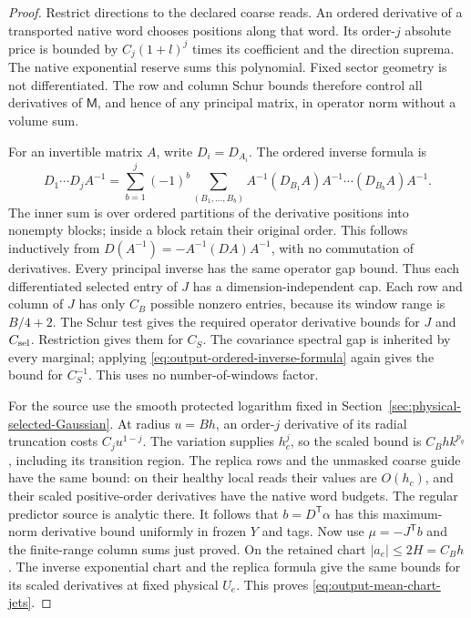 \documentclass[11pt,reqno]{amsart}
\numberwithin{equation}{section}
\theoremstyle{definition}
\theoremstyle{remark}
\begin{document}
\begin{proof}
Restrict directions to the declared coarse reads. An ordered
derivative of a transported native word chooses positions
along that word. Its order-\(j\) absolute price is bounded
by \(C_j(1+l)^j\) times its coefficient and the direction
suprema. The native exponential reserve sums this polynomial.
Fixed sector geometry is not differentiated. The row and
column Schur bounds therefore control all derivatives of
\(\mathsf M\), and hence of any principal matrix, in operator
norm without a volume sum.

For an invertible matrix \(A\), write \(D_i=D_{A_i}\).
The ordered inverse formula is
\begin{equation}
 D_1\cdots D_j A^{-1}
  =\sum_{b=1}^j(-1)^b
       \sum_{(B_1,\ldots,B_b)}
       A^{-1}(D_{B_1}A)A^{-1}\cdots(D_{B_b}A)A^{-1}.
 \label{eq:output-ordered-inverse-formula}
\end{equation}
The inner sum is over ordered partitions of the derivative
positions into nonempty blocks; inside a block retain their
original order. This follows inductively from
\(D(A^{-1})=-A^{-1}(DA)A^{-1}\), with no commutation of
derivatives. Every principal inverse has the same operator
gap bound. Thus each differentiated selected entry of \(J\)
has a dimension-independent cap. Each row and column of
\(J\) has only \(C_B\) possible nonzero entries, because its
window range is \(B/4+2\). The Schur test gives the required
operator derivative bounds for \(J\) and \(C_{\rm sel}\).
Restriction gives them for \(C_S\). The covariance spectral
gap is inherited by every marginal; applying
\eqref{eq:output-ordered-inverse-formula} again gives the
bound for \(C_S^{-1}\). This uses no number-of-windows factor.

For the source use the smooth protected logarithm fixed in
Section~\ref{sec:physical-selected-Gaussian}. At radius
\(u=Bh\), an order-\(j\) derivative of its radial truncation
costs \(C_ju^{1-j}\). The variation supplies \(h_c^j\), so
the scaled bound is \(C_Bh k^{p_q}\), including its transition
region. The replica rows and the unmasked coarse guide have
the same bound: on their healthy local reads their values are
\(O(h_c)\), and their scaled positive-order derivatives have
the native word budgets. The regular predictor source is
analytic there. It follows that \(b=D^{\mathsf T}\alpha\) has this
maximum-norm derivative bound uniformly in frozen \(Y\) and
tags. Now use \(\mu=-J^{\mathsf T}b\) and the finite-range column sums
just proved.
On the retained chart \(|a_e|\le2H=C_Bh\). The inverse
exponential chart and the replica formula give the same bounds
for its scaled derivatives at fixed physical \(U_e\).
This proves \eqref{eq:output-mean-chart-jets}.
\end{proof}
\end{document}
